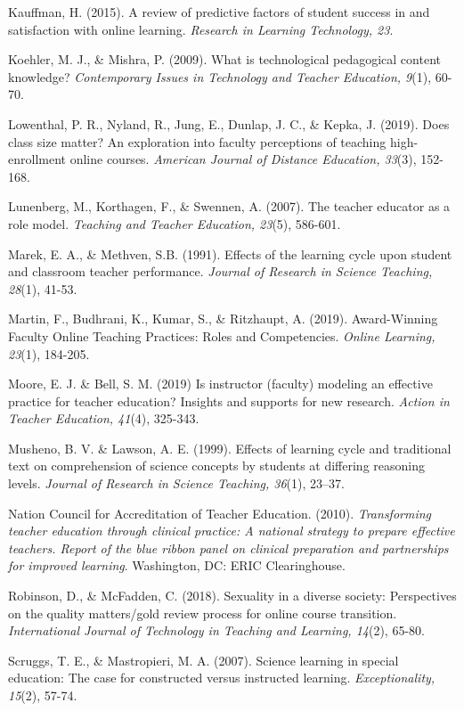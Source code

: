 \documentclass[11.5pt]{sig-alternate} %
\begin{document}
Kauffman, H. (2015). A review of predictive factors of student success in and satisfaction with online learning. \textit{Research in Learning Technology, 23}.

Koehler, M. J., \& Mishra, P. (2009). What is technological pedagogical content knowledge? \textit{Contemporary Issues in Technology and Teacher Education, 9}(1), 60-70.

Lowenthal, P. R., Nyland, R., Jung, E., Dunlap, J. C., \& Kepka, J. (2019). Does class size matter? An exploration into faculty perceptions of teaching high-enrollment online courses. \textit{American Journal of Distance Education, 33}(3), 152-168.

Lunenberg, M., Korthagen, F., \& Swennen, A. (2007). The teacher educator as a role model. \textit{Teaching and Teacher Education, 23}(5), 586-601. 

Marek, E. A., \& Methven, S.B. (1991). Effects of the learning cycle upon student and classroom teacher performance. \textit{Journal of Research in Science Teaching, 28}(1), 41-53.

Martin, F., Budhrani, K., Kumar, S., \& Ritzhaupt, A. (2019). Award-Winning Faculty Online Teaching Practices: Roles and Competencies. \textit{Online Learning, 23}(1), 184-205.

Moore, E. J. \& Bell, S. M. (2019) Is instructor (faculty) modeling an effective practice for teacher education?  Insights and supports for new research. \textit{Action in Teacher Education, 41}(4), 325-343. 

Musheno, B. V. \& Lawson, A. E. (1999). Effects of learning cycle and traditional text on comprehension of science concepts by students at differing reasoning levels. \textit{Journal of Research in Science Teaching, 36}(1), 23–37. 

Nation Council for Accreditation of Teacher Education. (2010). \textit{Transforming teacher education through clinical practice: A national strategy to prepare effective teachers. Report of the blue ribbon panel on clinical preparation and partnerships for improved learning}. Washington, DC: ERIC Clearinghouse.

Robinson, D., \& McFadden, C. (2018). Sexuality in a diverse society: Perspectives on the quality matters/gold review process for online course transition. \textit{International Journal of Technology in Teaching and Learning, 14}(2), 65-80.

Scruggs, T. E., \& Mastropieri, M. A. (2007). Science learning in special education: The case for constructed versus instructed learning. \textit{Exceptionality, 15}(2), 57-74.
\end{document}
